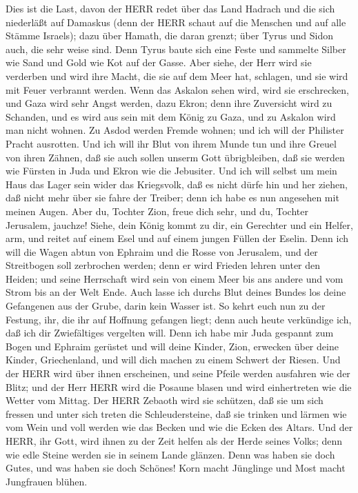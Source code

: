  Dies ist die Last, davon der HERR redet über das Land
Hadrach und die sich niederläßt auf Damaskus (denn der HERR schaut auf
die Menschen und auf alle Stämme Israels);  dazu über
Hamath, die daran grenzt; über Tyrus und Sidon auch, die sehr weise
sind.  Denn Tyrus baute sich eine Feste und sammelte Silber
wie Sand und Gold wie Kot auf der Gasse.  Aber siehe, der
Herr wird sie verderben und wird ihre Macht, die sie auf dem Meer hat,
schlagen, und sie wird mit Feuer verbrannt werden.  Wenn das
Askalon sehen wird, wird sie erschrecken, und Gaza wird sehr Angst
werden, dazu Ekron; denn ihre Zuversicht wird zu Schanden, und es wird
aus sein mit dem König zu Gaza, und zu Askalon wird man nicht wohnen.
 Zu Asdod werden Fremde wohnen; und ich will der Philister
Pracht ausrotten.  Und ich will ihr Blut von ihrem Munde tun
und ihre Greuel von ihren Zähnen, daß sie auch sollen unserm Gott
übrigbleiben, daß sie werden wie Fürsten in Juda und Ekron wie die
Jebusiter.  Und ich will selbst um mein Haus das Lager sein
wider das Kriegsvolk, daß es nicht dürfe hin und her ziehen, daß nicht
mehr über sie fahre der Treiber; denn ich habe es nun angesehen mit
meinen Augen.  Aber du, Tochter Zion, freue dich sehr, und
du, Tochter Jerusalem, jauchze! Siehe, dein König kommt zu dir, ein
Gerechter und ein Helfer, arm, und reitet auf einem Esel und auf einem
jungen Füllen der Eselin.  Denn ich will die Wagen abtun
von Ephraim und die Rosse von Jerusalem, und der Streitbogen soll
zerbrochen werden; denn er wird Frieden lehren unter den Heiden; und
seine Herrschaft wird sein von einem Meer bis ans andere und vom Strom
bis an der Welt Ende.  Auch lasse ich durchs Blut deines
Bundes los deine Gefangenen aus der Grube, darin kein Wasser ist.
 So kehrt euch nun zu der Festung, ihr, die ihr auf
Hoffnung gefangen liegt; denn auch heute verkündige ich, daß ich dir
Zwiefältiges vergelten will.  Denn ich habe mir Juda
gespannt zum Bogen und Ephraim gerüstet und will deine Kinder, Zion,
erwecken über deine Kinder, Griechenland, und will dich machen zu einem
Schwert der Riesen.  Und der HERR wird über ihnen
erscheinen, und seine Pfeile werden ausfahren wie der Blitz; und der
Herr HERR wird die Posaune blasen und wird einhertreten wie die Wetter
vom Mittag.  Der HERR Zebaoth wird sie schützen, daß sie um
sich fressen und unter sich treten die Schleudersteine, daß sie trinken
und lärmen wie vom Wein und voll werden wie das Becken und wie die Ecken
des Altars.  Und der HERR, ihr Gott, wird ihnen zu der Zeit
helfen als der Herde seines Volks; denn wie edle Steine werden sie in
seinem Lande glänzen.  Denn was haben sie doch Gutes, und
was haben sie doch Schönes! Korn macht Jünglinge und Most macht
Jungfrauen blühen.

